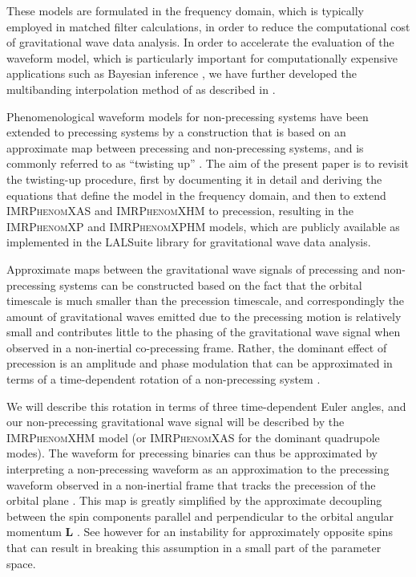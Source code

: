 \documentclass[%
aps,
prd,
amssymb,
amsmath,
amsfonts,
eqsecnum,
showpacs,
nofootinbib,
floatfix,
twocolumn,
twoside,
a4paper,
superscriptaddress
]{revtex4-1}
\newcommand{\phX}{\textsc{IMRPhenomXAS}\xspace}
\newcommand{\phXHM}{\textsc{IMRPhenomXHM}\xspace}
\newcommand{\phXP}{\textsc{IMRPhenomXP}\xspace}
\newcommand{\phXPHM}{\textsc{IMRPhenomXPHM}\xspace}
\begin{document}
These models are formulated in the frequency domain, which is typically employed in matched filter calculations, in order to reduce the computational cost of gravitational wave data analysis.
In order to accelerate the evaluation of the waveform model, which is particularly important for computationally expensive applications such as Bayesian inference \cite{Veitch:2014wba,Ashton:2018jfp}, we have 
further developed the multibanding interpolation method of \cite{Vinciguerra:2017ngf}
as described in \cite{Garcia-Quiros:2020qlt}.

Phenomenological waveform models for non-precessing systems have been extended to precessing systems \cite{Hannam:2013oca,Khan:2018fmp,Khan:2019kot} by a construction that is based on an
approximate map between precessing and non-precessing systems, and is commonly referred to as ``twisting up'' \cite{Schmidt:2010it,Schmidt:2012rh,Hannam:2013oca}.  
%
The aim of the present paper is to revisit the twisting-up procedure, first by documenting it in detail and deriving the equations that define the model in the frequency domain, and then to extend \phX and \phXHM to precession, resulting in the \phXP and \phXPHM models, which are publicly available as implemented in the LALSuite \cite{lalsuite} library for gravitational wave data analysis.

Approximate maps between the gravitational wave signals of precessing and non-precessing systems can be constructed based on the fact that the orbital timescale is much smaller than the precession timescale, and correspondingly the amount of gravitational waves emitted due to the precessing motion is relatively small and contributes little to the phasing of the gravitational wave signal when observed in a non-inertial co-precessing frame.
Rather, the dominant effect of precession is an amplitude and phase modulation that can be approximated in terms of a time-dependent rotation of a non-precessing system \cite{Schmidt:2010it,Schmidt:2012rh}.

We will describe this rotation in terms of three time-dependent Euler angles, and our non-precessing gravitational wave signal will be described by the \phXHM model (or \phX for the dominant quadrupole modes).
The waveform for precessing binaries can thus be approximated by interpreting a non-precessing waveform as an approximation to the precessing waveform observed in a non-inertial frame that tracks the precession of the orbital plane \cite{Schmidt:2010it}.
This map is greatly simplified by the approximate decoupling between the spin components parallel and perpendicular to the orbital angular momentum $\mathbf{L}$ \cite{Schmidt:2012rh}. See however \cite{Gerosa:2015hba} for an instability for approximately opposite spins that can result in breaking this assumption in a small part of the parameter space.
\end{document}
